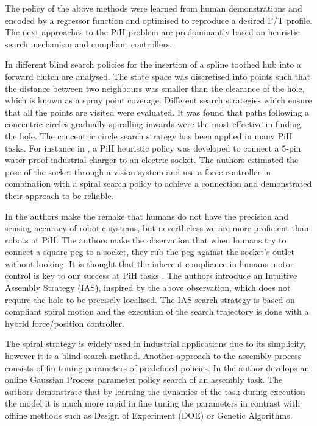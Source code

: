 The policy of the above methods were learned from human demonstrations and encoded by a regressor function and
optimised to reproduce a desired F/T profile. The next approaches to the PiH problem 
are predominantly based on heuristic search mechanism and compliant controllers.

In \cite{search_strategies_icra_2001} different blind search policies for the insertion of a spline toothed hub 
into a forward clutch are analysed. The state space was discretised into points such that the distance between two 
neighbours was smaller than the clearance of the hole, which is known as a spray point coverage. Different search 
strategies which ensure that all the points are visited were evaluated. It was found that paths following a 
concentric circles gradually spiralling inwards were the most effective in finding the hole. The concentric circle
search strategy has been applied in many PiH tasks. For instance in \cite{peg_imcssd_2015}, a PiH heuristic 
policy was developed to connect a 5-pin water proof industrial charger to an electric socket. The authors 
estimated the pose of the socket through a vision system and use a force controller in combination with a 
spiral search policy to achieve a connection and demonstrated their approach to be reliable. 

In \cite{intuitive_peg_isr_2013} the authors make the remake that humans do not have the precision and sensing 
accuracy of robotic systems, but nevertheless we are more proficient than robots at PiH. The authors make 
the observation that when humans try to connect a square peg to a socket, they rub the peg against the socket's 
outlet without looking. It is thought that the inherent compliance in humans motor control  
is key to our success at PiH tasks \cite{compliant_manip_icra_2008}. 
The authors introduce an Intuitive Assembly Strategy (IAS), inspired by the above observation, which 
does not require the hole to be precisely localised. The IAS search strategy is based on compliant 
spiral motion and the execution of the search trajectory is done with a hybrid force/position controller.

The spiral strategy is widely used in industrial applications due to its simplicity, 
however it is a blind search method. Another approach to the assembly process 
consists of fin tuning parameters of predefined policies. In \cite{online_gpr_icra_2014}
the author develops an online Gaussian Process parameter policy search of an assembly task. The authors
demonstrate that by learning the dynamics of the task during execution the model it is much more rapid in fine tuning 
the parameters in contrast with offline methods such as Design of Experiment (DOE) or Genetic Algorithms.

